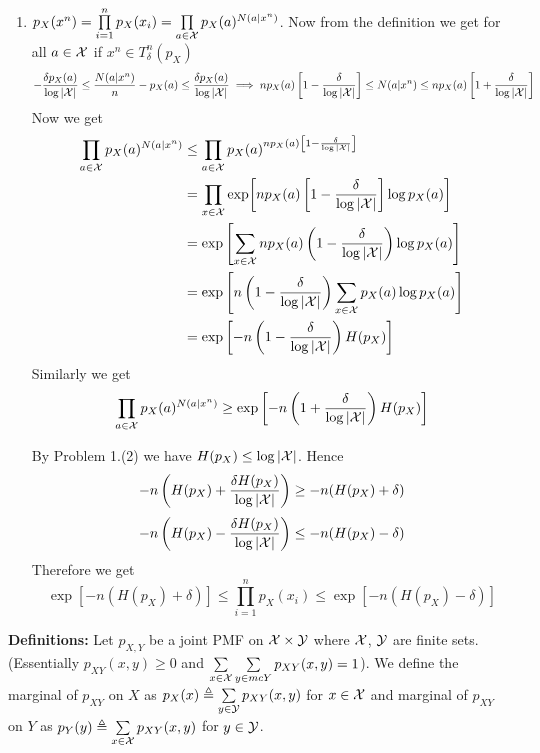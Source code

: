 \documentclass[a4paper, 11pt]{article}
\begin{document}
{\begin{enumerate}
		\item 
		$p_X(x^n)=\prod\limits_{i=1}^np_X(x_i)=\prod\limits_{a\in \mathcal{X}}p_X(a)^{N(a|x^n)}$. Now from the definition we get for all $a\in \mathcal{X}$ if $x^n\in T_{\delta}^n(p_X)$
$$
	 -\frac{\delta p_X(a)}{\log |\mathcal{X}|}\leq \frac{N(a|x^n)}{n}-p_X(a)\leq \frac{\delta p_X(a)}{\log |\mathcal{X}|}
	\implies  np_X(a)\left[ 1-\frac{\delta}{\log |\mathcal{X}|} \right]\leq N(a|x^n)\leq np_X(a)\left[ 1+\frac{\delta}{\log |\mathcal{X}|} \right]$$Now we get \begin{align*}
		\prod_{a\in \mathcal{X}}p_X(a)^{N(a|x^n)} & \leq \prod_{a\in \mathcal{X}}p_X(a)^{ np_X(a)\left[ 1-\frac{\delta}{\log |\mathcal{X}|} \right]}            \\
		                                   & =\prod_{x\in\mathcal{X}}\exp[ np_X(a)\left[ 1-\frac{\delta}{\log |\mathcal{X}|} \right]\log p_X(a)  ]       \\
		                                   & =\exp\left[ \sum_{x\in\mathcal{X}} np_X(a)\left( 1-\frac{\delta}{\log |\mathcal{X}|} \right)\log p_X(a)  \right] \\
		                                   & =\exp\left[ n\left( 1-\frac{\delta}{\log |\mathcal{X}|} \right) \sum_{x\in\mathcal{X}}p_X(a)\log p_X(a)\right]   \\
		                                   & = \exp\left[- n\left( 1-\frac{\delta}{\log |\mathcal{X}|} \right)H(p_X)\right]
	\end{align*}
Similarly we get $$\prod_{a\in \mathcal{X}}p_X(a)^{N(a|x^n)}\geq \exp\left[- n\left( 1+\frac{\delta}{\log |\mathcal{X}|} \right)H(p_X)\right]$$

By Problem 1.(2) we have $H(p_X)\leq \log |\mathcal{X}|$. Hence $$- n\left( H(p_X)+\frac{\delta H(p_X)}{\log |\mathcal{X}|} \right)\geq -n(H(p_X)+\delta)$$ $$- n\left( H(p_X)-\frac{\delta H(p_X)}{\log |\mathcal{X}|} \right)\leq -n(H(p_X)-\delta)$$Therefore we get $$\exp[-n(H(p_X)+\delta)]\leq \prod_{i=1}^np_X(x_i)\leq \exp[-n(H(p_X)-\delta)]$$
	\end{enumerate}
}

\pagebreak

 \parinf \textbf{Definitions:} Let $p_{X,Y}$ be a joint PMF on $\mathcal{X}\times \mathcal{Y}$ where $\mathcal{X}$, $\mathcal{Y}$ are finite sets. (Essentially $p_{XY}(x,y)\geq 0$ and $\sum\limits_{x\in \mathcal{X}}\sum\limits_{y\in mcY}p_{XY}(x,y)=1$). We define the marginal of $p_{XY}$ on $X$ as $p_X(x)\triangleq \sum\limits_{y\in \mathcal{Y}}p_{XY}(x,y)$ for $x\in \mathcal{X}$ and marginal of $p_{XY}$ on $Y$ as $p_Y(y)\triangleq \sum\limits_{x\in \mathcal{X}}p_{XY}(x,y)$ for $y\in \mathcal{Y}$. 
\parinn 
\end{document}
